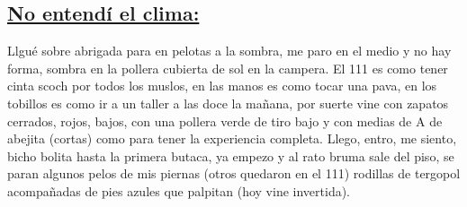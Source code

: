 \documentclass{article}
\date{}
\begin{document}
	\begin{adjustwidth}{-0.3cm}{15pt} %
 
		\section*{\vspace{0.8cm} \Large {\underline {\textbf{No entendí el clima:}}}}  %
		\end {adjustwidth} 
    
   
   
	\begin{large}
			Llgué sobre abrigada para en pelotas a la sombra, me paro en el medio y no hay forma, sombra en la pollera cubierta de sol en la campera. El 111 es como tener cinta scoch por todos los muslos, en las manos es como tocar una pava, en los tobillos es como ir a un taller a las doce la mañana, por suerte vine con zapatos cerrados, rojos, bajos, con una pollera verde de tiro bajo y con medias de A de abejita (cortas) como para tener la experiencia completa. Llego, entro, me siento, bicho bolita hasta la primera butaca, ya empezo y al rato bruma sale del piso, se paran algunos pelos de mis piernas (otros quedaron en el 111) rodillas de tergopol acompañadas de pies azules que palpitan (hoy vine invertida).

		\end{large}
\end{document}
